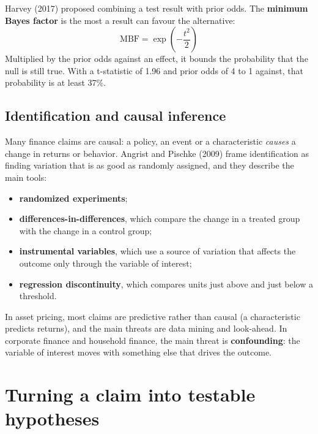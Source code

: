 Harvey (2017) proposed combining a test result with prior odds. The \textbf{minimum Bayes factor} is the most a result can favour the alternative:
\begin{equation}
  \mathrm{MBF} = \exp\!\left(-\frac{t^2}{2}\right)
  \label{eq:25-mbf}
\end{equation}
Multiplied by the prior odds against an effect, it bounds the probability that the null is still true. With a t-statistic of 1.96 and prior odds of 4 to 1 against, that probability is at least 37\%.

\subsection{Identification and causal inference}

Many finance claims are causal: a policy, an event or a characteristic \emph{causes} a change in returns or behavior. Angrist and Pischke (2009) frame identification as finding variation that is as good as randomly assigned, and they describe the main tools:

\begin{itemize}
  \item \textbf{randomized experiments};
  \item \textbf{differences-in-differences}, which compare the change in a treated group with the change in a control group;
  \item \textbf{instrumental variables}, which use a source of variation that affects the outcome only through the variable of interest;
  \item \textbf{regression discontinuity}, which compares units just above and just below a threshold.
\end{itemize}

In asset pricing, most claims are predictive rather than causal (a characteristic predicts returns), and the main threats are data mining and look-ahead. In corporate finance and household finance, the main threat is \textbf{confounding}: the variable of interest moves with something else that drives the outcome.

\section{Turning a claim into testable hypotheses}
\label{sec:25-hypotheses}

